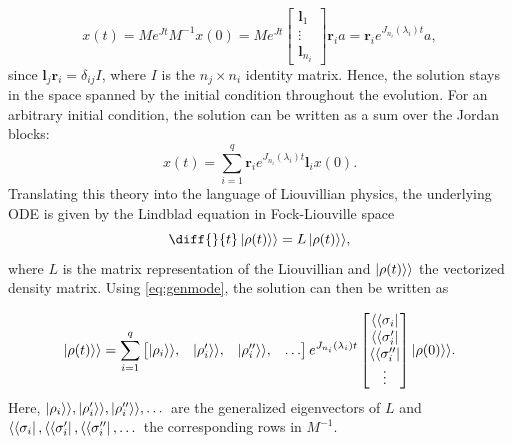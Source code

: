 \documentclass[../main.tex]{subfiles}
\begin{document}
\begin{equation}\label{eq:genmode}
    x(t) = Me^{Jt}M^{-1}x(0) = Me^{Jt} \begin{bmatrix} \boldsymbol{l}_1 \\ \vdots \\ \boldsymbol{l}_{n_i} \end{bmatrix} \boldsymbol{r}_ia = \boldsymbol{r}_i e^{J_{n_i}(\lambda_i)t} a,
\end{equation}
since $\boldsymbol{l}_j\boldsymbol{r}_i = \delta_{ij}I$, where $I$ is the $n_j\times n_i$ identity matrix. Hence, the solution stays in the space spanned by the initial condition throughout the evolution. For an arbitrary initial condition, the solution can be written as a sum over the Jordan blocks: 
\begin{equation}
    x(t) = \sum_{i=1}^q \boldsymbol{r}_i e^{J_{n_i}(\lambda_i)t} \boldsymbol{l}_i x(0).
\end{equation}
Translating this theory into the language of Liouvillian physics, the underlying ODE is given by the Lindblad equation in Fock-Liouville space    
\begin{equation}
    \diff{}{t}\ket{\rho(t)}\rangle = L \ket{\rho(t)}\rangle,
\end{equation}
where $L$ is the matrix representation of the Liouvillian and $\ket{\rho(t)}\rangle$ the vectorized density matrix. Using \cref{eq:genmode}, the solution can then be written as

\begin{equation}\label{eq:genmodeFL}
    \ket{\rho(t)}\rangle = \sum_{i=1}^q \begin{bmatrix} \ket{\rho_i}\rangle, & \ket{\rho_i'}\rangle, & \ket{\rho_i''}\rangle, & \dots \end{bmatrix} e^{J_{n_i}(\lambda_i)t} \begin{bmatrix} \langle\bra{\sigma_i} \\ \langle\bra{\sigma_i'}\\ \langle\bra{\sigma_i'' } \\ \vdots \end{bmatrix}\ket{\rho(0)}\rangle.
\end{equation}
Here, $\ket{\rho_i}\rangle, \ket{\rho_i'}\rangle, \ket{\rho_i''}\rangle, \dots$ are the generalized eigenvectors of $L$ and $\langle\bra{\sigma_i}, \langle\bra{\sigma_i'}, \langle\bra{\sigma_i'' }, \dots$ the corresponding rows in $M^{-1}$.
\end{document}

